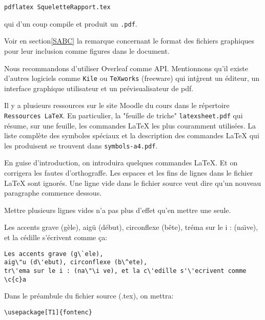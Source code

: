 \documentclass[a4paper,12pt,twoside]{article}
\begin{document}
\begin{verbatim}
pdflatex SqueletteRapport.tex
\end{verbatim}
qui d'un coup compile et produit un \verb+.pdf+.

Voir en section\ref{SABC} la remarque concernant le format des fichiers graphiques pour leur inclusion comme figures dans le document.

Nous recommandons d'utiliser Overleaf comme API. Mentionnons qu'il existe d'autres logiciels comme \verb+Kile+ ou \verb+TeXworks+ (freeware) qui int\`grent un \'editeur, un interface graphique utilisateur et un pr\'evisualisateur de pdf.

Il y a plusieurs ressources sur le site Moodle du cours dans le r\'epertoire \verb+Ressources LaTeX+. En particulier, la "feuille de triche" \verb+latexsheet.pdf+ qui r\'esume, sur une feuille, les commandes \LaTeX{} les plus couramment utilis\'ees. La liste compl\`ete des symboles sp\'eciaux et la description des commandes \LaTeX{} qui les produisent se trouvent dans \verb+symbols-a4.pdf+.
   
En guise  d'introduction, on introduira quelques commandes \LaTeX{}. 
Et on corrigera les fautes d'orthograffe. 
Les espaces        et        les         fins                       de    lignes
dans 
le 
fichier \LaTeX{} sont        ignor\'es. Une ligne vide dans le fichier source veut dire qu'un nouveau paragraphe commence dessous. 





Mettre plusieurs lignes vides n'a pas plus d'effet qu'en mettre une seule. 



Les accents grave (g\`ele), aig\"u (d\'ebut), circonflexe (b\^ete), tr\'ema 
sur le i : (na\"\i ve), et la c\'edille s'\'ecrivent comme \c{c}a: 
\begin{verbatim} 
Les accents grave (g\`ele), 
aig\"u (d\'ebut), circonflexe (b\^ete), 
tr\'ema sur le i : (na\"\i ve), et la c\'edille s'\'ecrivent comme 
\c{c}a
\end{verbatim}
 Dans le pr\'eambule du fichier source (.tex), on mettra:
\begin{verbatim}
\usepackage[T1]{fontenc}
\end{verbatim}
\end{document}
